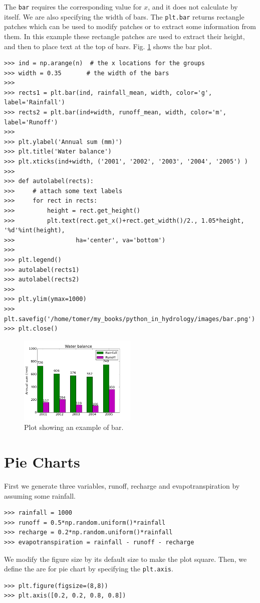 \documentclass[10pt]{book}
\begin{document}
The \verb"bar" requires the corresponding value for $x$, and it does not calculate by itself. We are also specifying the width of bars. The 
\verb"plt.bar" returns rectangle patches which can be used to modify  patches or to extract some information from them. In this example these rectangle patches are used to extract their height, and then to place text at the top of bars. Fig. \ref{fig:bar} shows the bar plot. 
\beforeverb \begin{verbatim}
>>> ind = np.arange(n)  # the x locations for the groups
>>> width = 0.35       # the width of the bars
>>> 
>>> rects1 = plt.bar(ind, rainfall_mean, width, color='g', label='Rainfall')
>>> rects2 = plt.bar(ind+width, runoff_mean, width, color='m', label='Runoff')
>>> 
>>> plt.ylabel('Annual sum (mm)')
>>> plt.title('Water balance')
>>> plt.xticks(ind+width, ('2001', '2002', '2003', '2004', '2005') )
>>> 
>>> def autolabel(rects):
>>>     # attach some text labels
>>>     for rect in rects:
>>>         height = rect.get_height()
>>>         plt.text(rect.get_x()+rect.get_width()/2., 1.05*height, '%d'%int(height),
>>>                 ha='center', va='bottom')
>>> 
>>> plt.legend()
>>> autolabel(rects1)
>>> autolabel(rects2)
>>> 
>>> plt.ylim(ymax=1000)
>>> plt.savefig('/home/tomer/my_books/python_in_hydrology/images/bar.png')
>>> plt.close()
\end{verbatim} \afterverb

\beforefig
\begin{figure}[h!]
  \centering
    \includegraphics[width=0.5\textwidth]{images/bar.png}
  \caption{Plot showing an example of bar.}
   \label{fig:bar}
\end{figure}
\afterfig

\section{Pie Charts}
First we generate three variables, runoff, recharge and evapotranspiration by assuming some rainfall. 
\beforeverb \begin{verbatim}
>>> rainfall = 1000
>>> runoff = 0.5*np.random.uniform()*rainfall
>>> recharge = 0.2*np.random.uniform()*rainfall
>>> evapotranspiration = rainfall - runoff - recharge
\end{verbatim} \afterverb
We modify the figure size by its default size to make the plot square. Then, we define the are for pie chart by specifying the \verb"plt.axis". 
\beforeverb \begin{verbatim}
>>> plt.figure(figsize=(8,8))
>>> plt.axis([0.2, 0.2, 0.8, 0.8])
\end{verbatim} \afterverb
\end{document}
